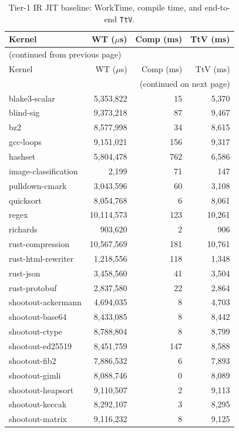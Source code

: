 \begin{longtable}{l r r r}
\caption{Tier-1 IR JIT baseline: WorkTime, compile time, and end-to-end \texttt{TtV}.}
\label{tbl:appB:tier1}\\
\toprule
Kernel & WT ($\mu$s) & Comp (ms) & TtV (ms) \\
\midrule
\endfirsthead
\multicolumn{4}{l}{\small (continued from previous page)} \\
\toprule
Kernel & WT ($\mu$s) & Comp (ms) & TtV (ms) \\
\midrule
\endhead
\midrule
\multicolumn{4}{r}{\small (continued on next page)} \\
\endfoot
\bottomrule
\endlastfoot
blake3-scalar & 5{,}353{,}822 & 15 & 5{,}370 \\
blind-sig & 9{,}373{,}218 & 87 & 9{,}467 \\
bz2 & 8{,}577{,}998 & 34 & 8{,}615 \\
gcc-loops & 9{,}151{,}021 & 156 & 9{,}317 \\
hashset & 5{,}804{,}478 & 762 & 6{,}586 \\
image-classification & 2{,}199 & 71 & 147 \\
pulldown-cmark & 3{,}043{,}596 & 60 & 3{,}108 \\
quicksort & 8{,}054{,}768 & 6 & 8{,}061 \\
regex & 10{,}114{,}573 & 123 & 10{,}261 \\
richards & 903{,}620 & 2 & 906 \\
rust-compression & 10{,}567{,}569 & 181 & 10{,}761 \\
rust-html-rewriter & 1{,}218{,}556 & 118 & 1{,}348 \\
rust-json & 3{,}458{,}560 & 41 & 3{,}504 \\
rust-protobuf & 2{,}837{,}580 & 22 & 2{,}864 \\
shootout-ackermann & 4{,}694{,}035 & 8 & 4{,}703 \\
shootout-base64 & 8{,}433{,}085 & 8 & 8{,}442 \\
shootout-ctype & 8{,}788{,}804 & 8 & 8{,}799 \\
shootout-ed25519 & 8{,}451{,}759 & 147 & 8{,}588 \\
shootout-fib2 & 7{,}886{,}532 & 6 & 7{,}893 \\
shootout-gimli & 8{,}088{,}746 & 0 & 8{,}089 \\
shootout-heapsort & 9{,}110{,}507 & 2 & 9{,}113 \\
shootout-keccak & 8{,}292{,}107 & 3 & 8{,}295 \\
shootout-matrix & 9{,}116{,}232 & 8 & 9{,}125 \\

\end{longtable}
